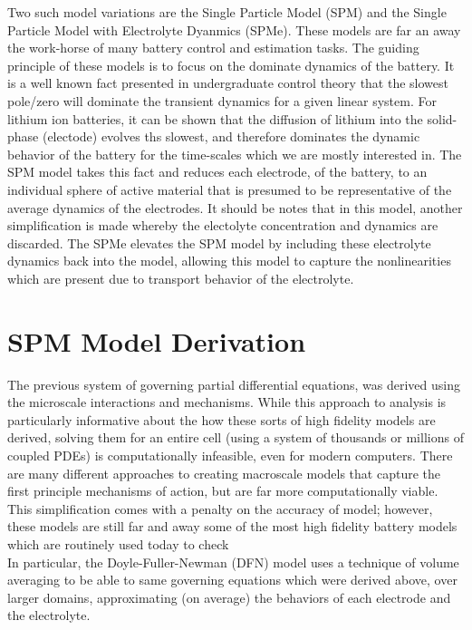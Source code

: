 \documentclass[lettersize,journal]{IEEEtran}
\begin{document}
Two such model variations are the Single Particle Model (SPM) and the Single Particle Model with Electrolyte Dyanmics (SPMe). These models are far an away the work-horse of many battery control and estimation tasks. The guiding principle of these models is to focus on the dominate dynamics of the battery. It is a well known fact presented in undergraduate control theory that the slowest pole/zero will dominate the transient dynamics for a given linear system. For lithium ion batteries, it can be shown that the diffusion of lithium into the solid-phase (electode) evolves ths slowest, and therefore dominates the dynamic behavior of the battery for the time-scales which we are mostly interested in. The SPM model takes this fact and reduces each electrode, of the battery, to an individual sphere of active material that is presumed to be representative of the average dynamics of the electrodes. It should be notes that in this model, another simplification is made whereby the electolyte concentration and dynamics are discarded. The SPMe elevates the SPM model by including these electrolyte dynamics back into the model, allowing this model to capture the nonlinearities which are present due to transport behavior of the electrolyte.


\section{SPM Model Derivation}

The previous system of governing partial differential equations, was derived using the microscale interactions and mechanisms. While this approach to analysis is particularly informative about the how these sorts of high fidelity models are derived, solving them for an entire cell (using a system of thousands or millions of coupled PDEs) is computationally infeasible, even for modern computers. There are many different approaches to creating macroscale models that capture the first principle mechanisms of action, but are far more computationally viable. This simplification comes with a penalty on the accuracy of model; however, these models are still far and away some of the most high fidelity battery models which are routinely used today to check  \\

In particular, the Doyle-Fuller-Newman (DFN) model uses a technique of volume averaging to be able to same governing equations which were derived above, over larger domains, approximating (on average) the behaviors of each electrode and the electrolyte. \\
\end{document}
